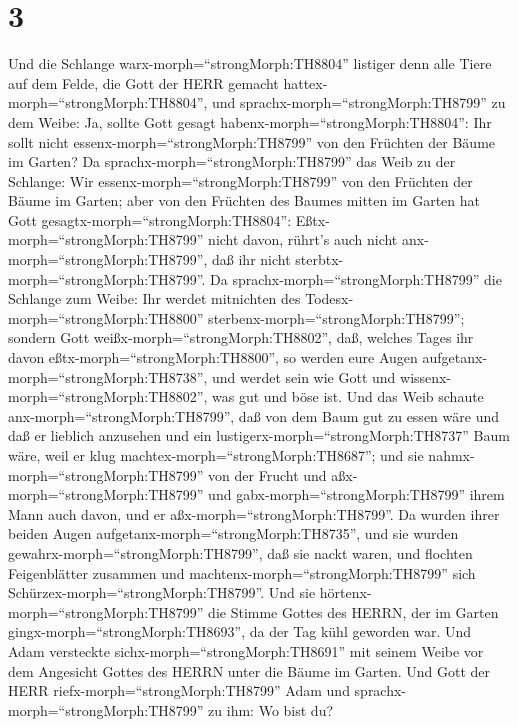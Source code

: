 \hypertarget{section-2}{%
\section{3}\label{section-2}}

 Und die Schlange warx-morph=``strongMorph:TH8804'' listiger
denn alle Tiere auf dem Felde, die Gott der HERR gemacht
hattex-morph=``strongMorph:TH8804'', und
sprachx-morph=``strongMorph:TH8799'' zu dem Weibe: Ja, sollte Gott
gesagt habenx-morph=``strongMorph:TH8804'': Ihr sollt nicht
essenx-morph=``strongMorph:TH8799'' von den Früchten der Bäume im
Garten?  Da sprachx-morph=``strongMorph:TH8799'' das Weib zu
der Schlange: Wir essenx-morph=``strongMorph:TH8799'' von den Früchten
der Bäume im Garten;  aber von den Früchten des Baumes
mitten im Garten hat Gott gesagtx-morph=``strongMorph:TH8804'':
Eßtx-morph=``strongMorph:TH8799'' nicht davon, rührt's auch nicht
anx-morph=``strongMorph:TH8799'', daß ihr nicht
sterbtx-morph=``strongMorph:TH8799''.  Da
sprachx-morph=``strongMorph:TH8799'' die Schlange zum Weibe: Ihr werdet
mitnichten des Todesx-morph=``strongMorph:TH8800''
sterbenx-morph=``strongMorph:TH8799'';  sondern Gott
weißx-morph=``strongMorph:TH8802'', daß, welches Tages ihr davon
eßtx-morph=``strongMorph:TH8800'', so werden eure Augen
aufgetanx-morph=``strongMorph:TH8738'', und werdet sein wie Gott und
wissenx-morph=``strongMorph:TH8802'', was gut und böse ist. 
Und das Weib schaute anx-morph=``strongMorph:TH8799'', daß von dem Baum
gut zu essen wäre und daß er lieblich anzusehen und ein
lustigerx-morph=``strongMorph:TH8737'' Baum wäre, weil er klug
machtex-morph=``strongMorph:TH8687''; und sie
nahmx-morph=``strongMorph:TH8799'' von der Frucht und
aßx-morph=``strongMorph:TH8799'' und gabx-morph=``strongMorph:TH8799''
ihrem Mann auch davon, und er aßx-morph=``strongMorph:TH8799''.
 Da wurden ihrer beiden Augen
aufgetanx-morph=``strongMorph:TH8735'', und sie wurden
gewahrx-morph=``strongMorph:TH8799'', daß sie nackt waren, und flochten
Feigenblätter zusammen und machtenx-morph=``strongMorph:TH8799'' sich
Schürzex-morph=``strongMorph:TH8799''.  Und sie
hörtenx-morph=``strongMorph:TH8799'' die Stimme Gottes des HERRN, der im
Garten gingx-morph=``strongMorph:TH8693'', da der Tag kühl geworden war.
Und Adam versteckte sichx-morph=``strongMorph:TH8691'' mit seinem Weibe
vor dem Angesicht Gottes des HERRN unter die Bäume im Garten.
 Und Gott der HERR riefx-morph=``strongMorph:TH8799'' Adam
und sprachx-morph=``strongMorph:TH8799'' zu ihm: Wo bist du?
